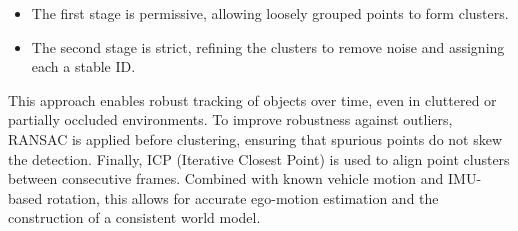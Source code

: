 \begin{itemize}
    \item The first stage is permissive, allowing loosely grouped points to form clusters.
    \item The second stage is strict, refining the clusters to remove noise and assigning each a stable ID.
\end{itemize}

This approach enables robust tracking of objects over time, even in cluttered or partially occluded environments.
To improve robustness against outliers, RANSAC is applied before clustering, ensuring that spurious points do not skew the detection.
Finally, ICP (Iterative Closest Point) is used to align point clusters between consecutive frames. 
Combined with known vehicle motion and IMU-based rotation, this allows for accurate ego-motion estimation and the construction of a consistent world model.


